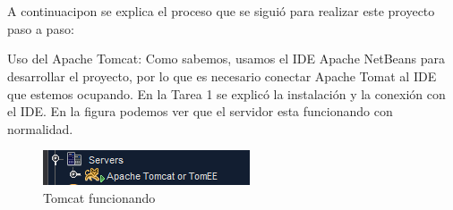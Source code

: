 \documentclass[10pt,a4paper]{article}
\begin{document}
\section{\color{colorIPN}{Desarrollo}}
A continuacipon se explica el proceso que se siguió para realizar este proyecto paso a paso:
	\item  Uso del Apache Tomcat: Como sabemos, usamos el IDE Apache NetBeans para desarrollar el proyecto, por lo que es necesario conectar Apache Tomat al IDE que estemos ocupando. En la Tarea 1 se explicó la instalación y la conexión con el IDE. En la figura podemos ver que el servidor esta funcionando con normalidad.
	\begin{figure}[H]
    	\includegraphics[scale=.8]{images/servidor.png}
    	\centering \linebreak \linebreak 
    	\caption{Tomcat funcionando}
    	\label{img:tomcat}
    \end{figure}  \hfill
\end{document}
